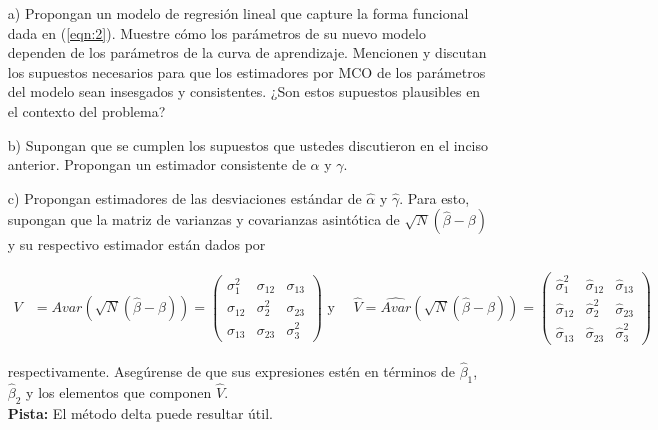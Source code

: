 \documentclass[a4paper]{article}
\begin{document}
\begin{itemize}

    \item[a)] Propongan un modelo de regresión lineal que capture la forma funcional dada en (\ref{eqn:2}).  Muestre cómo los parámetros de su nuevo modelo dependen de los parámetros de la curva de aprendizaje.  Mencionen y discutan los supuestos necesarios para que los estimadores por MCO de los parámetros del modelo sean insesgados y consistentes. ¿Son estos supuestos plausibles en el contexto del problema?
    
    \item[b)] Supongan que se cumplen los supuestos que ustedes discutieron en el inciso anterior. Propongan un estimador consistente de $\alpha$ y $\gamma$.
    
    \item[c)]Propongan estimadores de las desviaciones estándar de $\widehat{\alpha}$ y $\widehat{\gamma}$. Para esto, supongan que la matriz de varianzas y covarianzas asintótica de $\sqrt{N}(\widehat{\beta}-\beta)$ y su respectivo estimador están dados por
    
    \begin{align}
        V &= Avar(\sqrt{N}(\widehat{\beta}-\beta)) = \begin{pmatrix}
            \sigma_{1}^{2} & \sigma_{12} & \sigma_{13} \\
            \sigma_{12} & \sigma_{2}^{2} & \sigma_{23} \\
            \sigma_{13} & \sigma_{23} & \sigma_{3}^{2}
        \end{pmatrix} \mbox{  y  }
        \quad \hat{V} = \widehat{Avar}(\sqrt{N}(\widehat{\beta}-\beta)) = \begin{pmatrix}
            \widehat{\sigma}_{1}^{2} & \widehat{\sigma}_{12} & \widehat{\sigma}_{13} \\
            \widehat{\sigma}_{12} & \widehat{\sigma}_{2}^{2} & \widehat{\sigma}_{23} \\
            \widehat{\sigma}_{13} & \widehat{\sigma}_{23} & \widehat{\sigma}_{3}^{2}
        \end{pmatrix}
    \end{align}
    
    respectivamente. Asegúrense de que sus expresiones estén en términos de $\widehat{\beta}_{1}$, $\widehat{\beta}_{2}$ y los elementos que componen $\hat{V}$.\\
    
    \textbf{Pista:} El método delta puede resultar útil. 
    


\end{itemize}
\end{document}
